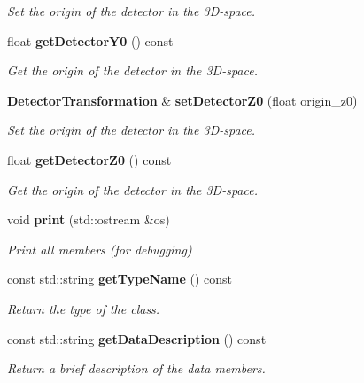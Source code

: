 \begin{DoxyCompactItemize}
\begin{DoxyCompactList}\small\item\em Set the origin of the detector in the 3\-D-\/space. \end{DoxyCompactList}\item 
float {\bf get\-Detector\-Y0} () const \label{classCALICE_1_1DetectorTransformation_a8b40f70eab9c5f3f7246d881757fc8e9}

\begin{DoxyCompactList}\small\item\em Get the origin of the detector in the 3\-D-\/space. \end{DoxyCompactList}\item 
{\bf Detector\-Transformation} \& {\bf set\-Detector\-Z0} (float origin\-\_\-z0)\label{classCALICE_1_1DetectorTransformation_a74831156933ee18369f6ea48d90e8f29}

\begin{DoxyCompactList}\small\item\em Set the origin of the detector in the 3\-D-\/space. \end{DoxyCompactList}\item 
float {\bf get\-Detector\-Z0} () const \label{classCALICE_1_1DetectorTransformation_aed697370c5d136d4424867598c79421d}

\begin{DoxyCompactList}\small\item\em Get the origin of the detector in the 3\-D-\/space. \end{DoxyCompactList}\item 
void {\bf print} (std\-::ostream \&os)\label{classCALICE_1_1DetectorTransformation_a53146e49344a9995016d521d423959fc}

\begin{DoxyCompactList}\small\item\em Print all members (for debugging) \end{DoxyCompactList}\item 
const std\-::string {\bf get\-Type\-Name} () const \label{classCALICE_1_1DetectorTransformation_a32750bb0d4ebc5fe3a62871a4b6a427a}

\begin{DoxyCompactList}\small\item\em Return the type of the class. \end{DoxyCompactList}\item 
const std\-::string {\bf get\-Data\-Description} () const \label{classCALICE_1_1DetectorTransformation_a5c2acba9e28ad26da43444e39bc220a7}

\begin{DoxyCompactList}\small\item\em Return a brief description of the data members. \end{DoxyCompactList}\end{DoxyCompactItemize}


